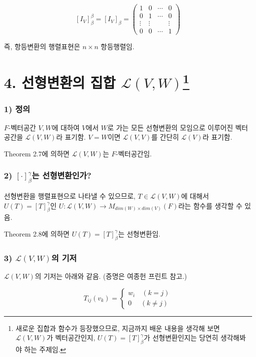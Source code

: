 \documentclass[10pt, a4paper]{article}
\begin{document}
\[
[I_{V}]_{\beta}^{\beta}=[I_{V}]_{\beta}=
\begin{pmatrix}
1 & 0 & \cdots & 0\\
0 & 1 & \cdots & 0\\
\vdots & \vdots & & \vdots\\
0 & 0 & \cdots & 1
\end{pmatrix}
\]

즉, 항등변환의 행렬표현은 $n \times n$ 항등행렬임.\\


\newpage


\section*{4. 선형변환의 집합 $\mathcal{L}(V,W)$\footnote{새로운 집합과 함수가 등장했으므로, 지금까지 배운 내용을 생각해 보면 $\mathcal{L}(V,W)$가 벡터공간인지, $U(T)=[T]_{\beta}^{\gamma}$가 선형변환인지는 당연히 생각해봐야 하는 주제임.}}

\subsubsection*{1) 정의}
$F$-벡터공간 $V,W$에 대하여 $V$에서 $W$로 가는 모든 선형변환의 모임으로 이루어진 벡터공간을 $\mathcal{L}(V,W)$라 표기함. $V=W$이면 $\mathcal{L}(V,V)$를 간단히 $\mathcal{L}(V)$라 표기함.

Theorem 2.7에 의하면 $\mathcal{L}(V,W)$는 $F$-벡터공간임.

\subsubsection*{2) $[\cdot]_{\beta}^{\gamma}$는 선형변환인가?}
선형변환을 행렬표현으로 나타낼 수 있으므로, $T \in \mathcal{L}(V,W)$에 대해서 $U(T)=[T]_{\beta}^{\gamma}$인 $U:\mathcal{L}(V,W) \rightarrow M_{dim(W) \times dim(V)}(F)$라는 함수를 생각할 수 있음.

Theorem 2.8에 의하면 $U(T)=[T]_{\beta}^{\gamma}$는 선형변환임.

\subsubsection*{3) $\mathcal{L}(V,W)$의 기저}
$\mathcal{L}(V,W)$의 기저는 아래와 같음. (증명은 여종헌 프린트 참고.)

$$
T_{ij}(v_k)=\begin{cases}
    w_i\quad(k=j)\\
    0\,\,\quad(k \neq j)
\end{cases}
$$
\end{document}
